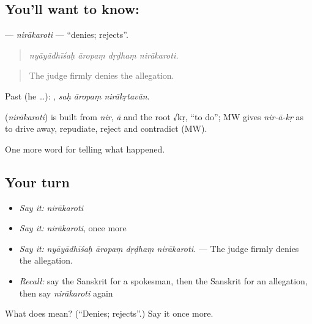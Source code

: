 \subsection*{You'll want to know: }
\textbf{} — \emph{nirākaroti} — \textquotedblleft{}denies; rejects\textquotedblright{}.

\begin{quote}
   
\end{quote}

\begin{quote}
\emph{nyāyādhīśaḥ āropaṃ dṛḍhaṃ nirākaroti.}
\end{quote}

\begin{quote}
The judge firmly denies the allegation.
\end{quote}

Past (he …):   , \emph{saḥ āropaṃ nirākṛtavān}.

\begin{cousinweb}
\textbf{} (\emph{nirākaroti}) is built from \emph{nir}, \emph{ā} and the root √kṛ, \textquotedblleft{}to do\textquotedblright{}; MW gives \emph{nir-ā-kṛ} as to drive away, repudiate, reject and contradict (MW).
\end{cousinweb}

\begin{grammarlens}[title={What you've built}]
One more word for telling what happened.
\end{grammarlens}

\subsection*{Your turn}
\begin{itemize}
\raggedright
  \item \emph{Say it:} \emph{nirākaroti}
  \item \emph{Say it:} \emph{nirākaroti}, once more
  \item \emph{Say it:} \emph{nyāyādhīśaḥ āropaṃ dṛḍhaṃ nirākaroti.} — The judge firmly denies the allegation.
  \item \emph{Recall:} say the Sanskrit for a spokesman, then the Sanskrit for an allegation, then say \emph{nirākaroti} again
\end{itemize}

\begin{tcolorbox}[breakable,colback=teal!4,colframe=teal!35!black,title={Before you move on}]
What does  mean? (\textquotedblleft{}Denies; rejects\textquotedblright{}.) Say it once more.
\end{tcolorbox}
